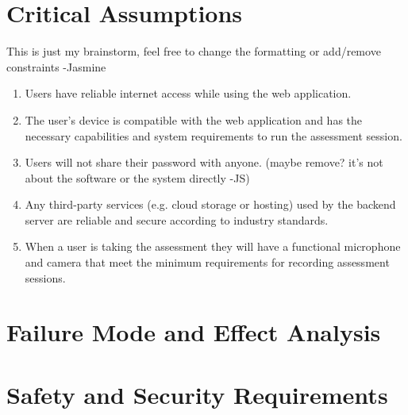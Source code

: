 \documentclass{article}
\begin{document}
\section{Critical Assumptions}

This is just my brainstorm, feel free to change the formatting or add/remove constraints -Jasmine
\begin{enumerate}
    \item Users have reliable internet access while using the web application.
    \item The user's device is compatible with the web application and has the necessary capabilities and system requirements to run the assessment session.
    \item Users will not share their password with anyone. (maybe remove? it's not about the software or the system directly -JS)
    \item Any third-party services (e.g. cloud storage or hosting) used by the backend server are reliable and secure according to industry standards.
    \item When a user is taking the assessment they will have a functional microphone and camera that meet the minimum requirements for recording assessment sessions.
\end{enumerate}

\section{Failure Mode and Effect Analysis}


\section{Safety and Security Requirements}
\end{document}
